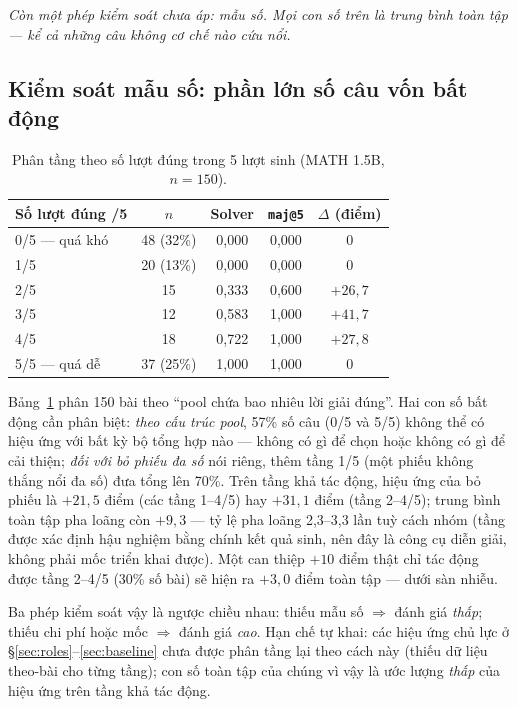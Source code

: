 \documentclass[11pt,a4paper]{article}
\begin{document}
\emph{Còn một phép kiểm soát chưa áp: mẫu số. Mọi con số trên là trung bình toàn tập --- kể cả
những câu không cơ chế nào cứu nổi.}

\subsection{Kiểm soát mẫu số: phần lớn số câu vốn bất động}\label{sec:denominator}

\begin{table}[t]\centering\small
\begin{tabular}{lcccc}\toprule
Số lượt đúng /5 & $n$ & Solver & \texttt{maj@5} & $\Delta$ (điểm)\\\midrule
0/5 --- quá khó & 48 (32\%) & 0,000 & 0,000 & 0\\
1/5 & 20 (13\%) & 0,000 & 0,000 & 0\\
2/5 & 15 & 0,333 & 0,600 & $+26{,}7$\\
3/5 & 12 & 0,583 & 1,000 & $+41{,}7$\\
4/5 & 18 & 0,722 & 1,000 & $+27{,}8$\\
5/5 --- quá dễ & 37 (25\%) & 1,000 & 1,000 & 0\\\bottomrule
\end{tabular}
\caption{Phân tầng theo số lượt đúng trong 5 lượt sinh (MATH 1.5B, $n=150$).}
\label{tab:strata}
\end{table}

Bảng~\ref{tab:strata} phân 150 bài theo ``pool chứa bao nhiêu lời giải đúng''. Hai con số bất
động cần phân biệt: \emph{theo cấu trúc pool}, 57\% số câu (0/5 và 5/5) không thể có hiệu ứng
với bất kỳ bộ tổng hợp nào --- không có gì để chọn hoặc không có gì để cải thiện; \emph{đối với
bỏ phiếu đa số} nói riêng, thêm tầng 1/5 (một phiếu không thắng nổi đa số) đưa tổng lên 70\%.
Trên tầng khả tác động, hiệu ứng của bỏ phiếu là $+21{,}5$ điểm (các tầng 1--4/5) hay $+31{,}1$
điểm (tầng 2--4/5); trung bình toàn tập pha loãng còn $+9{,}3$ --- tỷ lệ pha loãng 2,3--3,3 lần
tuỳ cách nhóm (tầng được xác định hậu nghiệm bằng chính kết quả sinh, nên đây là công cụ diễn
giải, không phải mốc triển khai được). Một can thiệp $+10$ điểm thật chỉ tác động được tầng
2--4/5 (30\% số bài) sẽ hiện ra $+3{,}0$ điểm toàn tập --- dưới sàn nhiễu.

Ba phép kiểm soát vậy là ngược chiều nhau: thiếu mẫu số $\Rightarrow$ đánh giá \emph{thấp};
thiếu chi phí hoặc mốc $\Rightarrow$ đánh giá \emph{cao}. Hạn chế tự khai: các hiệu ứng chủ
lực ở \S\ref{sec:roles}--\ref{sec:baseline} chưa được phân tầng lại theo cách này (thiếu dữ
liệu theo-bài cho từng tầng); con số toàn tập của chúng vì vậy là ước lượng \emph{thấp} của
hiệu ứng trên tầng khả tác động.
\end{document}
